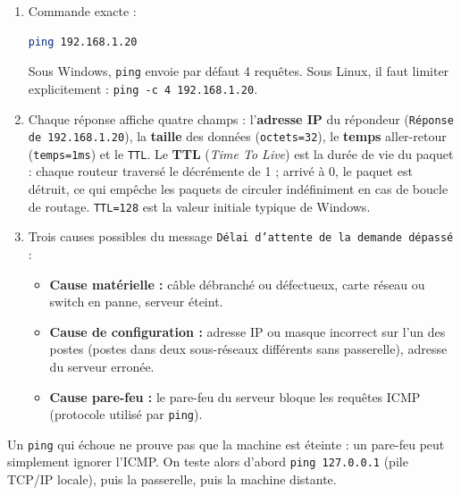 \documentclass[11pt]{article}
\begin{document}
\begin{corrige}

\begin{enumerate}
    \item Commande exacte :
\begin{lstlisting}[language=bash]
ping 192.168.1.20
\end{lstlisting}
    Sous Windows, \texttt{ping} envoie par défaut 4 requêtes. Sous Linux, il faut limiter explicitement : \texttt{ping -c 4 192.168.1.20}.
    \item Chaque réponse affiche quatre champs : l'\textbf{adresse IP} du répondeur (\texttt{Réponse de 192.168.1.20}), la \textbf{taille} des données (\texttt{octets=32}), le \textbf{temps} aller-retour (\texttt{temps=1ms}) et le \texttt{TTL}. Le \textbf{TTL} (\emph{Time To Live}) est la durée de vie du paquet : chaque routeur traversé le décrémente de 1 ; arrivé à 0, le paquet est détruit, ce qui empêche les paquets de circuler indéfiniment en cas de boucle de routage. \texttt{TTL=128} est la valeur initiale typique de Windows.
    \item Trois causes possibles du message \texttt{Délai d'attente de la demande dépassé} :
    \begin{itemize}
        \item \textbf{Cause matérielle :} câble débranché ou défectueux, carte réseau ou switch en panne, serveur éteint.
        \item \textbf{Cause de configuration :} adresse IP ou masque incorrect sur l'un des postes (postes dans deux sous-réseaux différents sans passerelle), adresse du serveur erronée.
        \item \textbf{Cause pare-feu :} le pare-feu du serveur bloque les requêtes ICMP (protocole utilisé par \texttt{ping}).
    \end{itemize}
\end{enumerate}

\begin{attention}
Un \texttt{ping} qui échoue ne prouve pas que la machine est éteinte : un pare-feu peut simplement ignorer l'ICMP. On teste alors d'abord \texttt{ping 127.0.0.1} (pile TCP/IP locale), puis la passerelle, puis la machine distante.
\end{attention}
\end{corrige}
\end{document}
